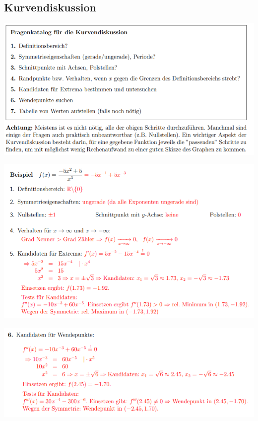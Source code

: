\subsection{Kurvendiskussion}
\begin{center}
    \includegraphics[width=1\linewidth]{images/kurvendiskussion_fragekatalog.png}
\end{center}

\begin{center}
    \includegraphics[width=1\linewidth]{images/kurvbsp.png}
\end{center}

\begin{center}
    \includegraphics[width=1\linewidth]{images/kurvbsp2.png}
\end{center}

